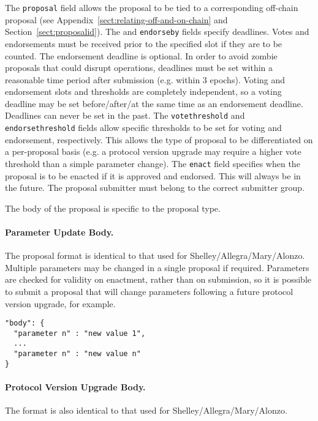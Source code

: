 The \texttt{proposal} field allows the proposal to be tied to a corresponding off-chain proposal (see Appendix~\ref{sect:relating-off-and-on-chain} and Section~\ref{sect:proposalid}).  The  and \texttt{endorseby} fields specify deadlines.
Votes and endorsements must be received prior to the specified slot if they are to be counted.  The endorsement deadline is optional.
In order to avoid zombie proposals that could disrupt operations, deadlines must be set within a reasonable time period after submission (e.g. within 3 epochs).
Voting and endorsement slots and thresholds are completely independent, so a voting deadline may be set before/after/at the same time as an endorsement deadline.
Deadlines can never be set in the past.
%
The \texttt{votethreshold} and \texttt{endorsethreshold} fields allow specific thresholds to be set for voting and endorsement, respectively.  This allows the type of proposal to be differentiated on a per-proposal basis
(e.g. a protocol version upgrade may require a higher vote threshold than a simple parameter change).
%
The \texttt{enact} field specifies when the proposal is to be enacted if it is approved and endorsed.  This will always be in the future.
%
The proposal submitter must belong to the correct submitter group.  

The body of the proposal is specific to the proposal type.

\newpage
\paragraph{Parameter Update Body.}  The proposal format is identical to that used for Shelley/Allegra/Mary/Alonzo.   Multiple parameters may be changed in a single proposal if required.
Parameters are checked for validity on enactment, rather than on submission, so it is possible to submit a proposal that will change parameters following a future protocol version upgrade, for example.


\begin{verbatim}
"body": {
  "parameter n" : "new value 1",
  ...
  "parameter n" : "new value n"
}
\end{verbatim}

\paragraph{Protocol Version Upgrade Body.}  The format is also identical to that used for Shelley/Allegra/Mary/Alonzo.


